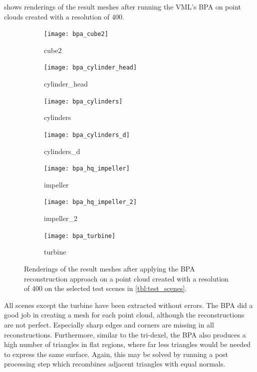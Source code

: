  shows renderings of the result meshes after running the VML's BPA on point clouds created with a resolution of 400.
%
\begin{figure}
	\centering
	\begin{subfigure}[b]{0.34\textwidth}
		\centering
		\texttt{[image: bpa\_cube2]}
		\caption{cube2}
		\label{fig:bpa_cube2}
	\end{subfigure}
	\hspace{1cm}
	\begin{subfigure}[b]{0.34\textwidth}
		\centering
		\texttt{[image: bpa\_cylinder\_head]}
		\caption{cylinder\_head}
		\label{fig:bpa_cylinder_head}
	\end{subfigure}
	\begin{subfigure}[b]{0.34\textwidth}
		\centering
		\texttt{[image: bpa\_cylinders]}
		\caption{cylinders}
		\label{fig:bpa_cylinders}
	\end{subfigure}
	\hspace{1cm}
	\begin{subfigure}[b]{0.34\textwidth}
		\centering
		\texttt{[image: bpa\_cylinders\_d]}
		\caption{cylinders\_d}
		\label{fig:bpa_cylinders_d}
	\end{subfigure}
	\begin{subfigure}[b]{0.34\textwidth}
		\centering
		\texttt{[image: bpa\_hq\_impeller]}
		\caption{impeller}
		\label{fig:bpa_hq_impeller}
	\end{subfigure}
	\hspace{1cm}
	\begin{subfigure}[b]{0.34\textwidth}
		\centering
		\texttt{[image: bpa\_hq\_impeller\_2]}
		\caption{impeller\_2}
		\label{fig:bpa_hq_impeller_2}
	\end{subfigure}
	\begin{subfigure}[b]{0.33\textwidth}
		\centering
		\texttt{[image: bpa\_turbine]}
		\caption{turbine}
		\label{fig:bpa_turbine}
	\end{subfigure}
	\caption{
		Renderings of the result meshes after applying the BPA reconstruction approach on a point cloud created with a resolution of 400 on the selected test scenes in \cref{tbl:test_scenes}.
	}
	\label{fig:bpa_results}
\end{figure}
%
All scenes except the turbine have been extracted without errors.
The BPA did a good job in creating a mesh for each point cloud, although the reconstructions are not perfect.
Especially sharp edges and corners are missing in all reconstructions.
Furthermore, similar to the tri-dexel, the BPA also produces a high number of triangles in flat regions, where far less triangles would be needed to express the same surface.
Again, this may be solved by running a post processing step which recombines adjacent triangles with equal normals.

